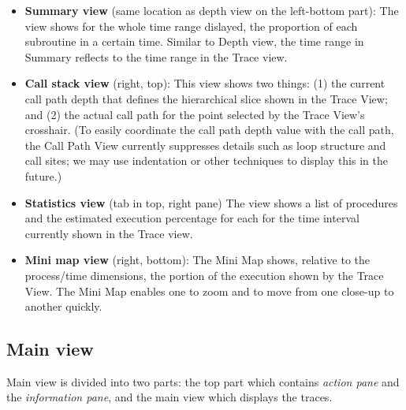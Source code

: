 \documentclass[english]{article}
\begin{document}
\begin{itemize}
\item \textbf{Summary view} (same location as depth view on the left-bottom part):
  The view shows for the whole time range dislayed, the proportion of each subroutine in a certain time.
  Similar to Depth view, the time range in Summary reflects to the time range in the Trace view. 

\item \textbf{Call stack view} (right, top):
  This view shows two things: (1) the current call path depth that defines the hierarchical slice shown in the Trace View; and (2) the actual call path for the point selected by the Trace View's crosshair.
  (To easily coordinate the call path depth value with the call path, the Call Path View currently suppresses details such as loop structure and call sites; we may use indentation or other techniques to display this in the future.)

\item \textbf{Statistics view} (tab in top, right pane)
  The view shows a list of procedures and the estimated execution percentage for each for the time interval currently shown in the Trace view. 


\item \textbf{Mini map view} (right, bottom):
  The Mini Map shows, relative to the process/time dimensions, the portion of the execution shown by the Trace View.
  The Mini Map enables one to zoom and to move from one close-up to another quickly.

\end{itemize}



\subsection{Main view}

Main view is divided into two parts: the top part which contains \emph{action pane} and the \emph{information pane}, and the main view which displays the traces. 
\end{document}
